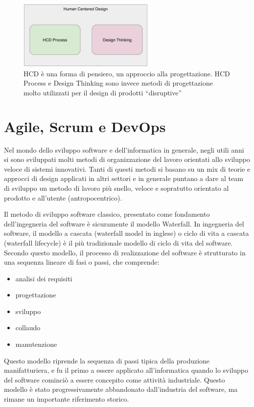 \begin{figure}
	\centering
	\includegraphics[width=0.6\textwidth]{immagini/dtvshcdp}
	\caption{HCD è una forma di pensiero, un approccio alla progettazione. HCD Process e Design Thinking sono invece metodi di progettazione molto utilizzati per il design di prodotti “disruptive”
}
\end{figure}

\section{Agile, Scrum e DevOps}
Nel mondo dello sviluppo software e dell'informatica in generale, negli utili anni si sono sviluppati molti metodi di organizzazione del lavoro orientati allo sviluppo veloce di sistemi innovativi. Tanti di questi metodi si basano su un mix di teorie e approcci di design applicati in altri settori e in generale puntano a dare al team di sviluppo un metodo di lavoro più snello, veloce e sopratutto orientato al prodotto e all'utente (antropocentrico).


Il metodo di sviluppo software classico, presentato come fondamento dell'ingegneria del software è sicuramente il modello Waterfall. In ingegneria del software, il modello a cascata (waterfall model in inglese) o ciclo di vita a cascata (waterfall lifecycle) è il più tradizionale modello di ciclo di vita del software. Secondo questo modello, il processo di realizzazione del software è strutturato in una sequenza lineare di fasi o passi, che comprende:

\begin{itemize}
    \item analisi dei requisiti
    \item progettazione
    \item sviluppo
    \item collaudo
    \item manutenzione

\end{itemize}

Questo modello riprende la sequenza di passi tipica della produzione manifatturiera, e fu il primo a essere applicato all'informatica quando lo sviluppo del software cominciò a essere concepito come attività industriale. Questo modello è stato progressivamente abbandonato dall'industria del software, ma rimane un importante riferimento storico.

